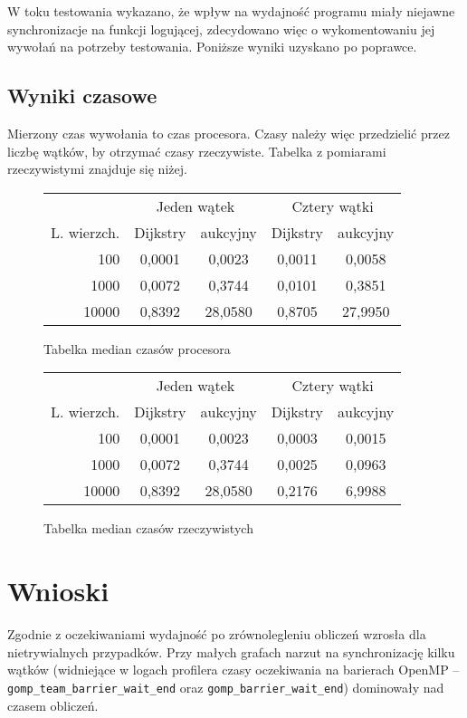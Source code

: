 \documentclass {article}
\begin{document}
W toku testowania wykazano, że wpływ na wydajność programu miały niejawne synchronizacje na funkcji logującej, zdecydowano więc o wykomentowaniu jej wywołań na potrzeby testowania. Poniższe wyniki uzyskano po poprawce.

\subsection{Wyniki czasowe}

Mierzony czas wywołania to czas procesora. Czasy należy więc przedzielić przez liczbę wątków, by otrzymać czasy rzeczywiste. Tabelka z pomiarami rzeczywistymi znajduje się niżej.

\begin{figure}[H]
\centering
\begin{tabular}{r|cc|cc}
 & \multicolumn{2}{c}{Jeden wątek}  & \multicolumn{2}{c}{Cztery wątki} \\
L. wierzch. & Dijkstry & aukcyjny & Dijkstry & aukcyjny \\
\hline
100   & 0,0001 & 0,0023 & 0,0011 & 0,0058 \\
1000  & 0,0072 & 0,3744 & 0,0101 & 0,3851 \\
10000 & 0,8392 & 28,0580 & 0,8705 & 27,9950  
\end{tabular}
\caption{Tabelka median czasów procesora}
\end{figure}

\begin{figure}[H]
\centering
\begin{tabular}{r|cc|cc}
 & \multicolumn{2}{c}{Jeden wątek}  & \multicolumn{2}{c}{Cztery wątki} \\
L. wierzch. & Dijkstry & aukcyjny & Dijkstry & aukcyjny \\
\hline
100   & 0,0001 & 0,0023 & 0,0003 & 0,0015 \\
1000  & 0,0072 & 0,3744 & 0,0025 & 0,0963 \\
10000 & 0,8392 & 28,0580 & 0,2176 & 6,9988
\end{tabular}
\caption{Tabelka median czasów rzeczywistych}
\end{figure}

\section{Wnioski}

Zgodnie z oczekiwaniami wydajność po zrównolegleniu obliczeń wzrosła dla nietrywialnych przypadków. Przy małych grafach narzut na synchronizację kilku wątków (widniejące w logach profilera czasy oczekiwania na barierach OpenMP -- \verb|gomp_team_barrier_wait_end| oraz \verb|gomp_barrier_wait_end|) dominowały nad czasem obliczeń.
\end{document}
